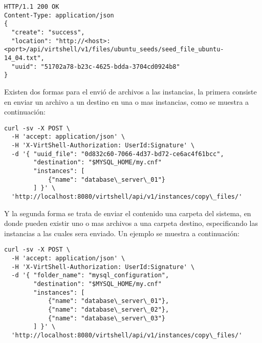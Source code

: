 \vspace{5mm}

\begin{lstlisting}[style=json, caption=Respuesta HTTP del almacenamiento de un archivo.]
HTTP/1.1 200 OK
Content-Type: application/json
{ 
  "create": "success",
  "location": "http://<host>:<port>/api/virtshell/v1/files/ubuntu_seeds/seed_file_ubuntu-14_04.txt",
  "uuid": "51702a78-b23c-4625-bdda-3704cd0924b8" 
}
\end{lstlisting}

\vspace{5mm}

Existen dos formas para el envió de archivos a las instancias, la primera consiste en enviar un archivo a un destino en una o mas instancias, como se muestra a continuación:

\vspace{5mm}

\begin{lstlisting}[style=json, caption=Ejemplo del envio de un archivo a una instancia.]
curl -sv -X POST \
  -H 'accept: application/json' \
  -H 'X-VirtShell-Authorization: UserId:Signature' \
  -d '{ "uuid_file": "0d832c60-7066-4d37-bd72-ce6ac4f61bcc",
        "destination": "$MYSQL_HOME/my.cnf"
        "instances": [
            {"name": "database\_server\_01"}
        ] }' \
  'http://localhost:8080/virtshell/api/v1/instances/copy\_files/'
\end{lstlisting}

\vspace{5mm}

Y la segunda forma se trata de enviar el contenido una carpeta del sistema, en donde pueden existir uno o mas archivos a una carpeta destino, especificando las instancias a las cuales sera enviado. Un ejemplo se muestra a continuación:

\vspace{5mm}

\begin{lstlisting}[style=json]
curl -sv -X POST \
  -H 'accept: application/json' \
  -H 'X-VirtShell-Authorization: UserId:Signature' \
  -d '{ "folder_name": "mysql_configuration",
        "destination": "$MYSQL_HOME/my.cnf"
        "instances": [
            {"name": "database\_server\_01"},
            {"name": "database\_server\_02"},
            {"name": "database\_server\_03"}
        ] }' \
  'http://localhost:8080/virtshell/api/v1/instances/copy\_files/'
\end{lstlisting}

